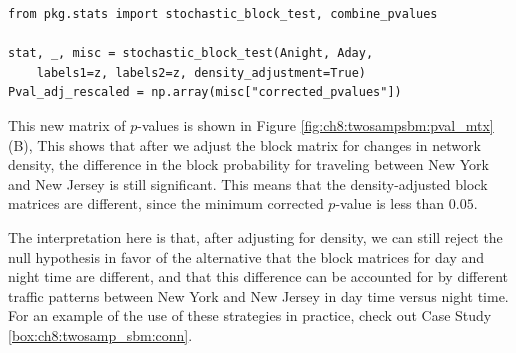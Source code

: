 \begin{lstlisting}[style=python]
from pkg.stats import stochastic_block_test, combine_pvalues

stat, _, misc = stochastic_block_test(Anight, Aday,
    labels1=z, labels2=z, density_adjustment=True)
Pval_adj_rescaled = np.array(misc["corrected_pvalues"])
\end{lstlisting}

This new matrix of $p$-values is shown in Figure \ref{fig:ch8:twosampsbm:pval_mtx}(B), This shows that after we adjust the block matrix for changes in network density, the difference in the block probability for traveling between New York and New Jersey is still significant. This means that the density-adjusted block matrices are different, since the minimum corrected $p$-value is less than $0.05$.


The interpretation here is that, after adjusting for density, we can still reject the null hypothesis in favor of the alternative that the block matrices for day and night time are different, and that this difference can be accounted for by different traffic patterns between New York and New Jersey in day time versus night time. For an example of the use of these strategies in practice, check out Case Study \ref{box:ch8:twosamp_sbm:conn}.


\newpage

